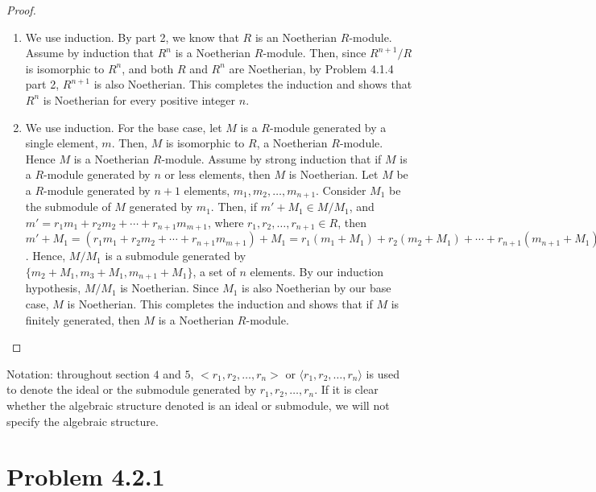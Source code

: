 \documentclass[12pt]{article}
\begin{document}
\begin{proof}
\begin{enumerate}
    Proceed as it is in Problem 3.0.2, we can show that $R^n/R^m$ is isomorphic to $^{n-m}$.
    \item We use induction. By part 2, we know that $R$ is an Noetherian $R$-module. Assume by induction that $R^n$ is a Noetherian $R$-module. Then, since $R^{n+1}/R$ is isomorphic to $R^n$, and both $R$ and $R^n$ are Noetherian, by Problem 4.1.4 part 2, $R^{n+1}$ is also Noetherian. This completes the induction and shows that $R^n$ is Noetherian for every positive integer $n$.
    \item We use induction. For the base case, let $M$ is a $R$-module generated by a single element, $m$. Then, $M$ is isomorphic to $R$, a Noetherian $R$-module. Hence $M$ is a Noetherian $R$-module. Assume by strong induction that if $M$ is a $R$-module generated by $n$ or less elements, then $M$ is Noetherian. Let $M$ be a $R$-module generated by $n+1$ elements, $m_1, m_2, \ldots, m_{n+1}$. Consider $M_1$ be the submodule of $M$ generated by $m_1$. Then, if $m' + M_1 \in M/M_1$, and $m' = r_1m_1 + r_2m_2 + \cdots + r_{n+1}m_{m+1}$, where $r_1, r_2, \ldots, r_{n+1} \in R$, then $m'+M_1 = (r_1m_1 + r_2m_2 + \cdots + r_{n+1}m_{m+1}) + M_1 = r_1(m_1+M_1) + r_2(m_2+M_1) + \cdots + r_{n+1}(m_{n+1}+M_1) = r_2(m_2+M_1) + r_3(m_3+M_1) + \cdots + r_{n+1}(m_{n+1}+M_1)$. Hence, $M/M_1$ is a submodule generated by $\{m_2 + M_1, m_3 + M_1, m_{n+1} + M_1\}$, a set of $n$ elements. By our induction hypothesis, $M/M_1$ is Noetherian. Since $M_1$ is also Noetherian by our base case, $M$ is Noetherian. This completes the induction and shows that if $M$ is finitely generated, then $M$ is a Noetherian $R$-module.
\end{enumerate}
\end{proof}
Notation: throughout section $4$ and $5$, $<r_1, r_2, \ldots, r_n>$ or $\langle r_1, r_2, \ldots, r_n \rangle$ is used to denote the ideal or the submodule generated by $r_1, r_2, \ldots, r_n$. If it is clear whether the algebraic structure denoted is an ideal or submodule, we will not specify the algebraic structure.
\newpage 

\section{Problem 4.2.1}
\end{document}

